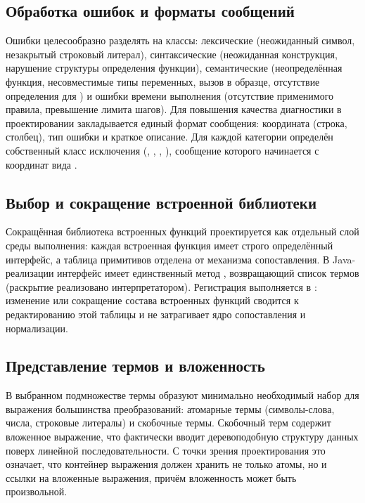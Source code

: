 \subsection{Обработка ошибок и форматы сообщений}

Ошибки целесообразно разделять на классы: лексические (неожиданный символ, незакрытый строковый литерал), синтаксические (неожиданная конструкция,
нарушение структуры определения функции), семантические (неопределённая функция, несовместимые типы переменных, вызов в образце,
отсутствие определения для ) и ошибки времени выполнения (отсутствие применимого правила, превышение лимита шагов).
Для повышения качества диагностики в проектировании закладывается единый формат сообщения: координата (строка, столбец), тип ошибки
и краткое описание. Для каждой категории определён собственный класс исключения
(, , , ),
сообщение которого начинается с координат вида .

\subsection{Выбор и сокращение встроенной библиотеки}

Сокращённая библиотека встроенных функций проектируется как отдельный слой среды выполнения: каждая встроенная функция имеет строго определённый
интерфейс, а таблица примитивов отделена от механизма сопоставления. В Java-реализации интерфейс
 имеет единственный метод
, возвращающий список термов (раскрытие реализовано
интерпретатором). Регистрация выполняется в :
изменение или сокращение состава встроенных функций сводится к редактированию этой таблицы и
не затрагивает ядро сопоставления и нормализации.

\subsection{Представление термов и вложенность}

В выбранном подмножестве термы образуют минимально необходимый набор для выражения большинства  преобразований:
атомарные термы (символы-слова, числа, строковые литералы) и скобочные термы. Скобочный терм содержит вложенное выражение, что фактически вводит
деревоподобную структуру данных поверх линейной последовательности. С точки зрения проектирования это означает, что контейнер выражения
должен хранить не только атомы, но и ссылки на вложенные выражения, причём вложенность может быть произвольной.

